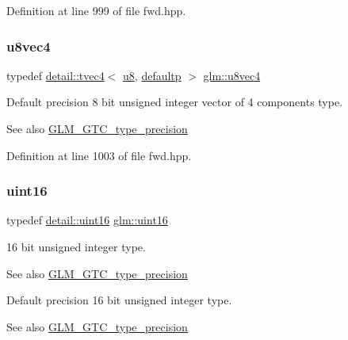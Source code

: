 Definition at line 999 of file fwd.\+hpp.

\mbox{\label{group__gtc__type__precision_gaaf6b3d127698d893de8652deedfd3d9b}} 
\subsubsection{\texorpdfstring{u8vec4}{u8vec4}}
{\footnotesize\ttfamily typedef \hyperlink{structglm_1_1detail_1_1tvec4}{detail\+::tvec4}$<$ \hyperlink{group__gtc__type__precision_ga5e3dc67373d5068997d2d9f41c9024d2}{u8}, \hyperlink{namespaceglm_a0f04f086094c747d227af4425893f545a9d21ccd8b5a009ec7eb7677befc3bf51}{defaultp} $>$ \hyperlink{group__gtc__type__precision_gaaf6b3d127698d893de8652deedfd3d9b}{glm\+::u8vec4}}

Default precision 8 bit unsigned integer vector of 4 components type. \begin{DoxySeeAlso}{See also}
\hyperlink{group__gtc__type__precision}{G\+L\+M\+\_\+\+G\+T\+C\+\_\+type\+\_\+precision} 
\end{DoxySeeAlso}


Definition at line 1003 of file fwd.\+hpp.

\mbox{\label{group__gtc__type__precision_gad8c2939e1fdd8e5828b31d95c52255d5}} 
\subsubsection{\texorpdfstring{uint16}{uint16}}
{\footnotesize\ttfamily typedef \hyperlink{namespaceglm_1_1detail_a47b2a7d006d187338e8031a352d1ce56}{detail\+::uint16} \hyperlink{group__gtc__type__precision_gad8c2939e1fdd8e5828b31d95c52255d5}{glm\+::uint16}}

16 bit unsigned integer type. \begin{DoxySeeAlso}{See also}
\hyperlink{group__gtc__type__precision}{G\+L\+M\+\_\+\+G\+T\+C\+\_\+type\+\_\+precision}
\end{DoxySeeAlso}
Default precision 16 bit unsigned integer type. \begin{DoxySeeAlso}{See also}
\hyperlink{group__gtc__type__precision}{G\+L\+M\+\_\+\+G\+T\+C\+\_\+type\+\_\+precision} 
\end{DoxySeeAlso}


